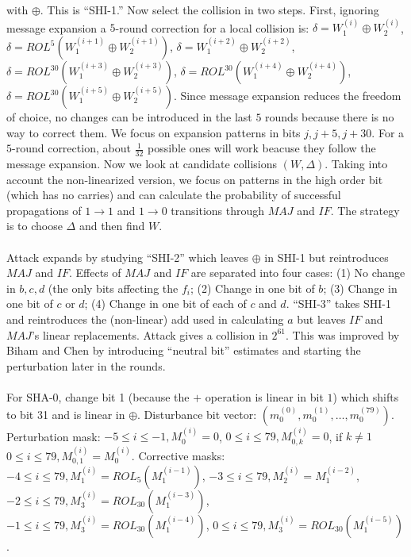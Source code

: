 with $\oplus$.  This is ``SHI-1.''
Now select the collision in two steps.  
First, ignoring message expansion a $5$-round correction for a
local collision is: 
$\delta= W_1^{(i)} \oplus W_2^{(i)}$,
$\delta= ROL^{5}(W_1^{(i+1)} \oplus W_2^{(i+1)})$,
$\delta= W_1^{(i+2)} \oplus W_2^{(i+2)}$,
$\delta= ROL^{30}(W_1^{(i+3)} \oplus W_2^{(i+3)})$,
$\delta= ROL^{30}(W_1^{(i+4)} \oplus W_2^{(i+4)})$,
$\delta= ROL^{30}(W_1^{(i+5)} \oplus W_2^{(i+5)})$.
Since message expansion reduces the freedom of choice,
no changes can be introduced in the last $5$ rounds because there is
no way to correct them.  We focus on expansion patterns in bits $j, j+5, j+30$.
For a $5$-round correction, about ${\frac 1 {32}}$ possible ones will work beacuse they
follow the message
expansion.  Now we look at candidate collisions $(W, \Delta)$.  Taking into account
the non-linearized version, we focus on patterns in the high order bit (which has no carries) and
can calculate the probability of successful propagations of $1 \rightarrow 1$ and $1 \rightarrow 0$
transitions through $MAJ$ and $IF$.  The strategy is to choose $\Delta$ and then find $W$.
\\
\\
Attack expands by studying ``SHI-2'' which leaves $\oplus$ in SHI-1 but reintroduces
$MAJ$ and $IF$.  Effects of $MAJ$ and $IF$ are separated into four cases:
(1) No change in $b,c,d$ (the only bits affecting the $f_i$;
(2) Change in one bit of $b$;
(3) Change in one bit of $c$ or $d$;
(4) Change in one bit of each of $c$ and $d$.
``SHI-3'' takes SHI-1 and reintroduces the (non-linear) add used in calculating $a$ but leaves
$IF$ and $MAJ$'s linear replacements.  Attack gives a collision in $2^{61}$.  This was improved
by Biham and Chen by introducing ``neutral bit'' estimates and starting the perturbation later
in the rounds.
\\
\\
For SHA-0, change bit 1 (because the $+$ operation is linear in bit $1$)
which shifts to bit 31 and
is linear in $\oplus$.  Disturbance bit vector: 
$( m_{0}^{(0)}, m_{0}^{(1)}, \ldots , m_{0}^{(79)})$.  Perturbation mask:
$-5 \le i \le -1, M_{0}^{(i)}=0$,
$0 \le i \le 79, M_{0,k}^{(i)}=0$, if $k \ne 1$
$0 \le i \le 79, M_{0,1}^{(i)}= M_0^{(i)}$.  Corrective masks:
$-4 \le i \le 79, M_{1}^{(i)}= ROL_{5}(M_{1}^{(i-1)})$,
$-3 \le i \le 79, M_{2}^{(i)}= M_{1}^{(i-2)}$,
$-2 \le i \le 79, M_{3}^{(i)}= ROL_{30}(M_{1}^{(i-3)})$,
$-1 \le i \le 79, M_{3}^{(i)}= ROL_{30}(M_{1}^{(i-4)})$,
$0 \le i \le 79, M_{3}^{(i)}= ROL_{30}(M_{1}^{(i-5)})$.  
\\
